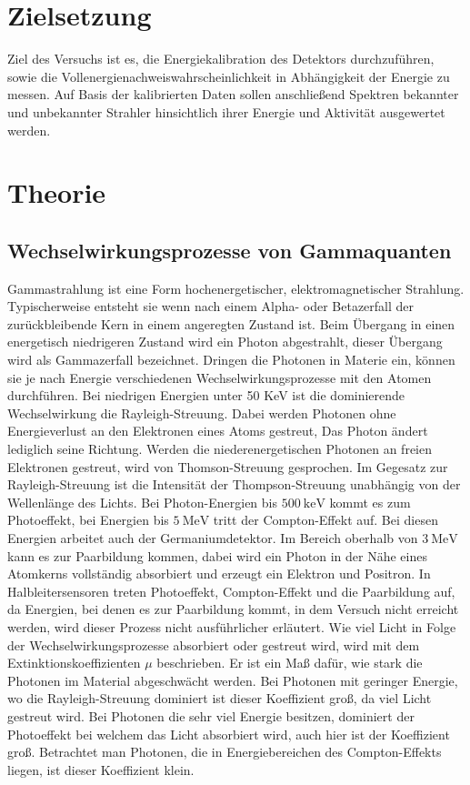 
\section{Zielsetzung}
\label{sec:Zielsetzung}
Ziel des Versuchs ist es, die Energiekalibration des Detektors durchzuführen, sowie 
die Vollenergienachweiswahrscheinlichkeit in Abhängigkeit der Energie zu messen. Auf Basis der kalibrierten Daten sollen 
anschließend Spektren bekannter und unbekannter Strahler hinsichtlich ihrer Energie und Aktivität ausgewertet werden.

\section{Theorie}
\label{sec:Theorie}
\subsection{Wechselwirkungsprozesse von Gammaquanten}
Gammastrahlung ist eine Form hochenergetischer, elektromagnetischer Strahlung. Typischerweise entsteht sie wenn nach einem 
Alpha- oder Betazerfall der zurückbleibende Kern in einem angeregten Zustand ist. Beim Übergang in einen energetisch niedrigeren 
Zustand wird ein Photon abgestrahlt, dieser Übergang wird als Gammazerfall bezeichnet. Dringen die Photonen in Materie ein, können sie 
je nach Energie verschiedenen Wechselwirkungsprozesse mit den Atomen durchführen. Bei niedrigen Energien unter 50 KeV ist die
dominierende Wechselwirkung die Rayleigh-Streuung. Dabei werden Photonen ohne Energieverlust an den Elektronen eines Atoms gestreut,
Das Photon ändert lediglich seine Richtung. Werden die niederenergetischen Photonen an freien Elektronen gestreut, wird von 
Thomson-Streuung gesprochen. Im Gegesatz zur Rayleigh-Streuung ist die Intensität der Thompson-Streuung unabhängig von der Wellenlänge des Lichts.
Bei Photon-Energien bis $\qty{500}{\kilo\electronvolt}$ kommt es zum Photoeffekt, bei Energien bis $\qty{5}{\mega\electronvolt}$ tritt der Compton-Effekt auf. Bei diesen 
Energien arbeitet auch der Germaniumdetektor. Im Bereich oberhalb von $\qty{3}{\mega\electronvolt}$ kann es zur 
Paarbildung kommen, dabei wird ein Photon in der Nähe eines Atomkerns vollständig absorbiert und erzeugt ein Elektron und Positron.
In Halbleitersensoren treten Photoeffekt, Compton-Effekt und die Paarbildung auf, da Energien, bei denen es zur Paarbildung kommt, in dem Versuch
nicht erreicht werden, wird dieser Prozess nicht ausführlicher erläutert. Wie viel Licht in Folge der Wechselwirkungsprozesse absorbiert oder 
gestreut wird, wird mit dem Extinktionskoeffizienten $\mu$ beschrieben. Er ist ein Maß dafür, wie stark die Photonen im Material abgeschwächt werden. Bei
Photonen mit geringer Energie, wo die Rayleigh-Streuung dominiert ist dieser Koeffizient groß, da viel Licht gestreut wird. Bei Photonen die sehr 
viel Energie besitzen, dominiert der Photoeffekt bei welchem das Licht absorbiert wird, auch hier ist der Koeffizient groß. Betrachtet man Photonen, die 
in Energiebereichen des Compton-Effekts liegen, ist dieser Koeffizient klein.
\cite{Gammastrahlung}


